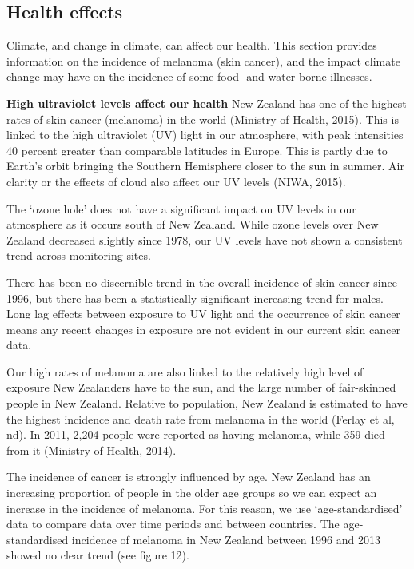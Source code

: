 \documentclass[11pt]{article} %
\begin{document}
\subsection{Health effects}
Climate, and change in climate, can affect our health. This section provides information on the incidence of melanoma (skin cancer), and the impact climate change may have on the incidence of some food- and water-borne illnesses.

\textbf{High ultraviolet levels affect our health}
New Zealand has one of the highest rates of skin cancer (melanoma) in the world (Ministry of Health, 2015). This is linked to the high ultraviolet (UV) light in our atmosphere, with peak intensities 40 percent greater than comparable latitudes in Europe. This is partly due to Earth’s orbit bringing the Southern Hemisphere closer to the sun in summer. Air clarity or the effects of cloud also affect our UV levels (NIWA, 2015).

The ‘ozone hole’ does not have a significant impact on UV levels in our atmosphere as it occurs south of New Zealand. While ozone levels over New Zealand decreased slightly since 1978, our UV levels have not shown a consistent trend across monitoring sites.

There has been no discernible trend in the overall incidence of skin cancer since 1996, but there has been a statistically significant increasing trend for males. Long lag effects between exposure to UV light and the occurrence of skin cancer means any recent changes in exposure are not evident in our current skin cancer data.

Our high rates of melanoma are also linked to the relatively high level of exposure New Zealanders have to the sun, and the large number of fair-skinned people in New Zealand. Relative to population, New Zealand is estimated to have the highest incidence and death rate from melanoma in the world (Ferlay et al, nd). In 2011, 2,204 people were reported as having melanoma, while 359 died from it (Ministry of Health, 2014).

The incidence of cancer is strongly influenced by age. New Zealand has an increasing proportion of people in the older age groups so we can expect an increase in the incidence of melanoma. For this reason, we use ‘age-standardised’ data to compare data over time periods and between countries. The age-standardised incidence of melanoma in New Zealand between 1996 and 2013 showed no clear trend (see figure 12).

\end{document}

